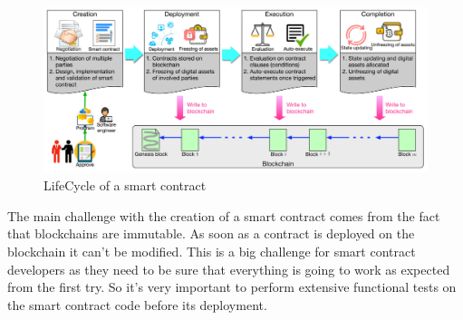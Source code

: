\begin{figure}[h!]
    \centering
    \includegraphics[scale=0.5]{Figures/smart_contract_life_cycle.png}
    \caption{LifeCycle of a smart contract \cite{ZHENG2020475}}
\end{figure}
The main challenge with the creation of a smart contract comes from the fact that blockchains are immutable. As soon as a contract is deployed on the blockchain it can't be modified.
This is a big challenge for smart contract developers as they need to be sure that everything is going to work as expected from the first try.
So it's very important to perform extensive functional tests on the smart contract code before its deployment. \cite{ZHENG2020475}


